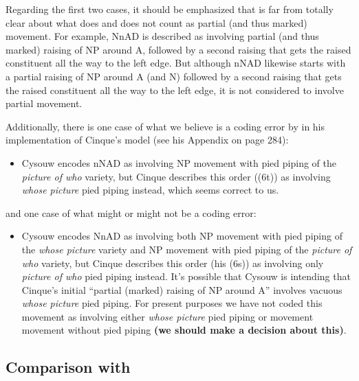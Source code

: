 \documentclass[11pt]{article}
\begin{document}
%
Regarding the first two cases, it should be emphasized that
\citet{cinque2005deriving} is far from totally clear about what does and
does not count as partial (and thus marked) movement.  For example,
NnAD is described as involving partial (and thus marked) raising of NP
around A, followed by a second raising that gets the raised
constituent all the way to the left edge. But although nNAD likewise starts
with a partial raising of NP around A (and N) followed by a second
raising that gets the raised constituent all the way to the left edge,
it is not considered to involve partial movement.

Additionally, there is one case of what we believe is a coding error
by \citet{cysouw2010dealing} in his implementation of Cinque's model
(see his Appendix on page 284): 

\begin{itemize}
\item Cysouw encodes nNAD as involving NP movement with pied piping of
  the \emph{picture of who} variety, but Cinque describes this order
  ((6t)) as involving \emph{whose picture} pied piping instead, which
  seems correct to us.
\end{itemize}
%
and one case of what might or might not be a coding error:
%
\begin{itemize}
 \item Cysouw encodes NnAD as involving both NP movement with pied
  piping of the \emph{whose picture} variety and NP movement with pied
  piping of the \emph{picture of who} variety, but Cinque describes
  this order (his (6s)) as involving only \emph{picture of who} pied
  piping instead.  It's possible that Cysouw is intending that
  Cinque's initial ``partial (marked) raising of NP around A''
  involves vacuous \emph{whose picture} pied piping.  For present
  purposes we have not coded this movement as involving either
  \emph{whose picture} pied piping or movement movement without pied
  piping \textbf{(we should make a decision about this)}.
\end{itemize}

\subsection{Comparison with \citet{merlo2015predicting}}
\end{document}
